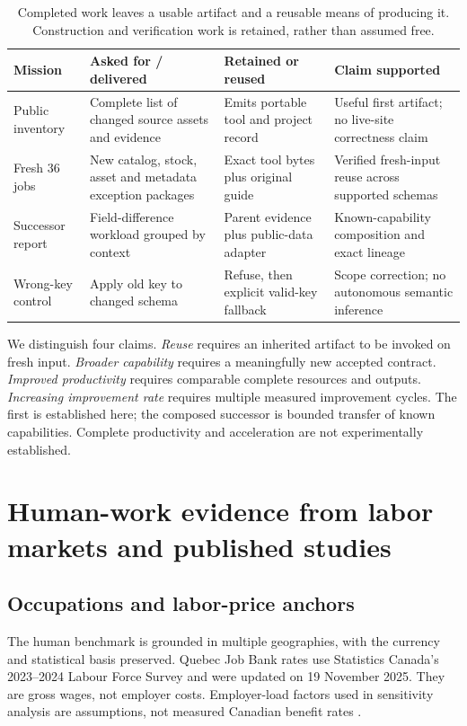 \documentclass[11pt,a4paper]{article}
\newcommand{\smalltable}{\small\setlength{\tabcolsep}{5pt}}
\begin{document}
\begin{table}[H]\centering\smalltable
\begin{tabularx}{\linewidth}{P{.18\linewidth}YYY}
\toprule
Mission & Asked for / delivered & Retained or reused & Claim supported\\
\midrule
Public inventory & Complete list of changed source assets and evidence & Emits portable tool and project record & Useful first artifact; no live-site correctness claim\\
Fresh 36 jobs & New catalog, stock, asset and metadata exception packages & Exact tool bytes plus original guide & Verified fresh-input reuse across supported schemas\\
Successor report & Field-difference workload grouped by context & Parent evidence plus public-data adapter & Known-capability composition and exact lineage\\
Wrong-key control & Apply old key to changed schema & Refuse, then explicit valid-key fallback & Scope correction; no autonomous semantic inference\\
\bottomrule
\end{tabularx}
\caption{Completed work leaves a usable artifact and a reusable means of producing it. Construction and verification work is retained, rather than assumed free.}
\end{table}

We distinguish four claims. \emph{Reuse} requires an inherited artifact to be invoked on fresh input. \emph{Broader capability} requires a meaningfully new accepted contract. \emph{Improved productivity} requires comparable complete resources and outputs. \emph{Increasing improvement rate} requires multiple measured improvement cycles. The first is established here; the composed successor is bounded transfer of known capabilities. Complete productivity and acceleration are not experimentally established.

\section{Human-work evidence from labor markets and published studies}

\subsection{Occupations and labor-price anchors}

The human benchmark is grounded in multiple geographies, with the currency and statistical basis preserved. Quebec Job Bank rates use Statistics Canada's 2023--2024 Labour Force Survey and were updated on 19 November 2025. They are gross wages, not employer costs. Employer-load factors used in sensitivity analysis are assumptions, not measured Canadian benefit rates \citep{jobbank_qc_dataentry2025,jobbank_qc_bookkeeping2025,jobbank_qc_dataanalyst2025,jobbank_methodology2026,statcan_wageguide2024}.
\end{document}
